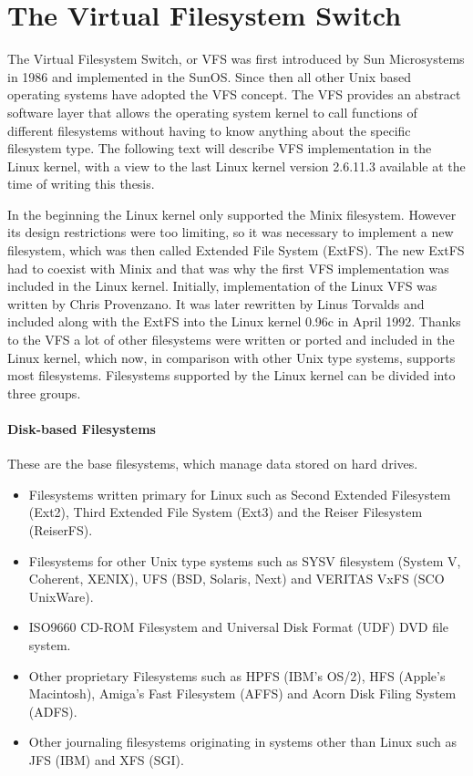 \chapter{The Virtual Filesystem Switch}
The Virtual Filesystem Switch, or VFS was first introduced by Sun Microsystems
in 1986 and implemented in the SunOS. Since then all other Unix based
operating systems have adopted the VFS concept. The VFS provides an abstract software layer
that allows the operating system kernel to call functions of different filesystems
without having to know anything about the specific filesystem type. The following
text will describe VFS implementation in the Linux kernel, with a view to the last
Linux kernel version 2.6.11.3 available at the time of writing this thesis. 

In the beginning the Linux kernel only supported the Minix filesystem. However its design
restrictions were too limiting, so it was necessary to implement a new filesystem,
which was then called Extended File System (ExtFS). The new ExtFS had to coexist with
Minix and that was why the first VFS implementation was included in the Linux kernel.
Initially, implementation of the Linux VFS was written by Chris Provenzano. It
was later
rewritten by Linus Torvalds and included along with the ExtFS into the Linux kernel
0.96c in April 1992. Thanks to the VFS a lot of other filesystems were written or
ported and included in the Linux kernel, which now, in comparison with
other Unix type systems, supports most filesystems. Filesystems supported by the Linux kernel can
be divided into three groups.

\subsubsection*{Disk-based Filesystems}
These are the base filesystems, which manage data stored on hard drives.
\begin{itemize}
	\item Filesystems written primary for Linux such as Second Extended Filesystem
		(Ext2), Third Extended File System (Ext3) and the Reiser Filesystem
		(ReiserFS).
	\item Filesystems for other Unix type systems such as SYSV filesystem
		(System V, Coherent, XENIX), UFS (BSD, Solaris, Next) and VERITAS VxFS
		(SCO UnixWare).
	\item ISO9660 CD-ROM Filesystem and Universal Disk Format (UDF) DVD file
		system.
	\item Other proprietary Filesystems such as HPFS (IBM's OS/2), HFS (Apple's
		Macintosh), Amiga's Fast Filesystem (AFFS) and Acorn Disk Filing
		System (ADFS).
	\item Other journaling filesystems originating in systems other than Linux
		such as JFS (IBM) and XFS (SGI).
\end{itemize}

